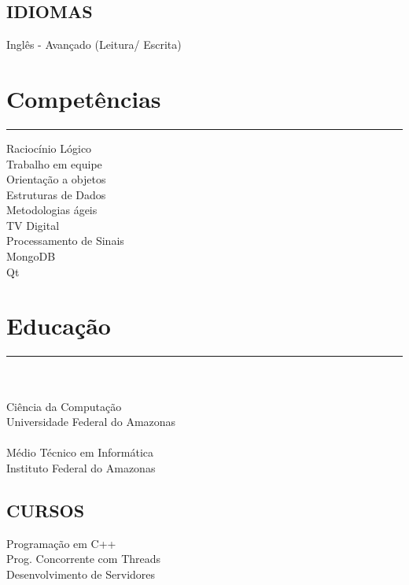 \documentclass[]{rahulworld-resume}
\begin{document}
\begin{minipage}[t]{0.33\textwidth}
\subsection{IDIOMAS}
Inglês - Avançado (Leitura/ Escrita)
\sectionsep
\section{Competências}
\noindent\rule{5cm}{0.4pt}

Raciocínio Lógico\\
Trabalho em equipe\\
Orientação a objetos\\
Estruturas de Dados\\
Metodologias ágeis\\
TV Digital\\
Processamento de Sinais\\
MongoDB\\
Qt
\sectionsep
\section{Educação} 
\noindent\rule{5cm}{0.4pt}\\
\\
Ciência da Computação\\
Universidade Federal do Amazonas \\
\vspace{8pt}
\\
Médio Técnico em Informática\\
Instituto Federal do Amazonas\\
\vspace{8pt}
\subsection{CURSOS}
Programação em C++\\
Prog. Concorrente com Threads\\
Desenvolvimento de Servidores
\sectionsep
%
%

\end{minipage} 
\hfill
\end{document}
